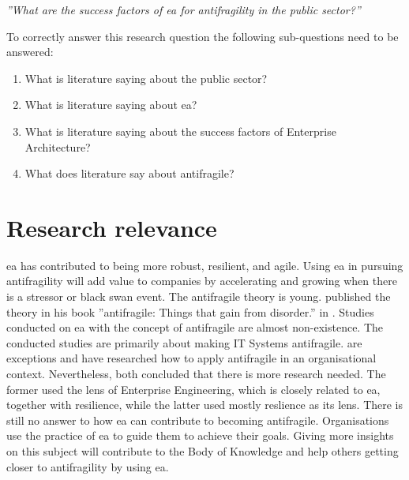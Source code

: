 \noindent \emph{''What are the success factors of \acrlong{ea} for \gls{antifragility} in the public sector?''}\bigskip

\noindent To correctly answer this research question the following sub-questions need to be answered:

\begin{enumerate}
	\item{What is literature saying about the public sector?}
	\item{What is literature saying about \acrlong{ea}?}
	\item{What is literature saying about the success factors of Enterprise Architecture?}
	\item{What does literature say about antifragile?}
\end{enumerate}
\section{Research relevance}
\label{sec:researchrelevance}
\acrfull{ea} has contributed to being more \gls{robust}, \gls{resilient}, and \gls{agile}. Using \acrshort{ea} in pursuing \gls{antifragility} will add value to companies by accelerating and growing when there is a stressor or black swan event. The \gls{antifragile} theory is young.  \citeauthor{Taleb2012} published the theory in his book ''\Gls{antifragile}: Things that gain from disorder.'' in \citeyear{Taleb2012}.  Studies conducted on \acrshort{ea} with the concept of \gls{antifragile} are almost non-existence. The conducted studies are primarily about making IT Systems \gls{antifragile}. \textcite{Botjes2020,Kastner2017} are exceptions and have researched how to apply \gls{antifragile} in an organisational context. Nevertheless, both concluded that there is more research needed. The former used the lens of Enterprise Engineering, which is closely related to \acrshort{ea}, together with resilience, while the latter used mostly reslience as its lens. There is still no answer to how \acrshort{ea} can contribute to becoming \gls{antifragile}. Organisations use the practice of \acrshort{ea} to guide them to achieve their goals. Giving more insights on this subject will contribute to the Body of Knowledge and help others getting closer to \gls{antifragility} by using \acrshort{ea}.


